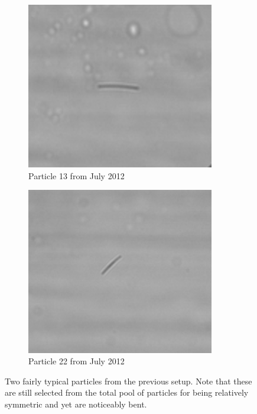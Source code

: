 
\begin{figure}[H]
\centering
\begin{subfigure}[b]{0.45\textwidth}
\includegraphics[width=0.9\textwidth]{figures/improvements/oldparticle2.png}
\caption{Particle 13 from July 2012}
\end{subfigure}
\begin{subfigure}[b]{0.45\textwidth}
\includegraphics[width=0.9\textwidth]{figures/improvements/oldparticle3.png}
\caption{Particle 22 from July 2012}
\end{subfigure}
\caption{Two fairly typical particles from the previous setup. Note that these are still selected from the total pool of particles for being relatively symmetric and yet are noticeably bent.}
\label{fig:oldparticles}
\end{figure}



